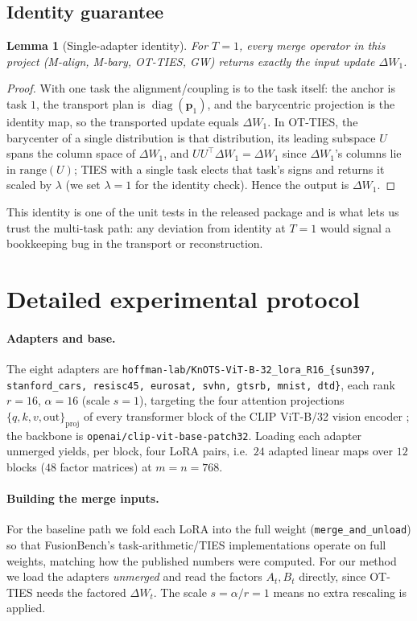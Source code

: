 \documentclass[11pt]{article}
\newtheorem{lemma}{Lemma}
\newcommand{\dW}{\Delta W}
\newcommand{\diag}{\operatorname{diag}}
\newcommand{\otties}{\textsc{OT-TIES}}
\begin{document}
\subsection{Identity guarantee}
\begin{lemma}[Single-adapter identity]
\label{lem:identity}
For $T=1$, every merge operator in this project (M-align, M-bary, \otties{}, GW) returns exactly the input
update $\dW_1$.
\end{lemma}
\begin{proof}
With one task the alignment/coupling is to the task itself: the anchor is task $1$, the transport plan is
$\diag(\bm p_1)$, and the barycentric projection is the identity map, so the transported update equals
$\dW_1$. In \otties{}, the barycenter of a single distribution is that distribution, its leading subspace
$U$ spans the column space of $\dW_1$, and $U U^\top \dW_1=\dW_1$ since $\dW_1$'s columns lie in
$\mathrm{range}(U)$; TIES with a single task elects that task's signs and returns it scaled by $\lambda$
(we set $\lambda=1$ for the identity check). Hence the output is $\dW_1$.
\end{proof}
\noindent This identity is one of the unit tests in the released package and is what lets us trust the
multi-task path: any deviation from identity at $T=1$ would signal a bookkeeping bug in the transport or
reconstruction.

\section{Detailed experimental protocol}
\label{app:protocol}
\paragraph{Adapters and base.} The eight adapters are
\texttt{hoffman-lab/KnOTS-ViT-B-32\_lora\_R16\_\{sun397, stanford\_cars, resisc45, eurosat, svhn, gtsrb,
mnist, dtd\}}, each rank $r=16$, $\alpha=16$ (scale $s=1$), targeting the four attention projections
$\{q,k,v,\text{out}\}_{\text{proj}}$ of every transformer block of the CLIP ViT-B/32 vision encoder
\citep{radford2021clip}; the backbone is \texttt{openai/clip-vit-base-patch32}. Loading each adapter
unmerged yields, per block, four LoRA pairs, i.e.\ $24$ adapted linear maps over $12$ blocks ($48$ factor
matrices) at $m{=}n{=}768$.
\paragraph{Building the merge inputs.} For the baseline path we fold each LoRA into the full weight
(\texttt{merge\_and\_unload}) so that FusionBench's task-arithmetic/TIES implementations operate on full
weights, matching how the published numbers were computed. For our method we load the adapters
\emph{unmerged} and read the factors $A_t,B_t$ directly, since \otties{} needs the factored $\dW_t$. The
scale $s=\alpha/r=1$ means no extra rescaling is applied.
\end{document}

